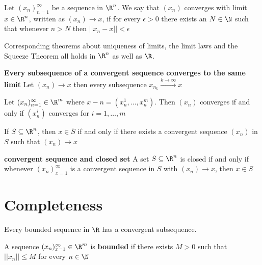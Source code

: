 \documentclass[11pt]{article}
\begin{document}
\begin{defn*}
  Let $(x_n)_{n=1}^{\infty}$ be a sequence in $\R^n$. We say that $(x_n)$ converges with limit $x\in\R^n$, written as $(x_n)\to x$, if for every $\epsilon > 0$ there exists an $N\in\N$ such that whenever $n> N$ then $|| x_n - x|| < \epsilon$
  \begin{rem}
    Corresponding theorems about uniqueness of limits, the limit laws and the Squeeze Theorem all holds in $\R^n$ as well as $\R$.
  \end{rem}
\end{defn*}

\begin{theorem*}
  \textbf{Every subsequence of a convergent sequence converges to the same limit} Let $(x_n) \to x$ then every subsequence $x_{n_k} \xrightarrow{k\to \infty} x$
\end{theorem*}

\begin{proposition*}
   Let $(x_n)_{n=1}^{\infty} \in \R^m$ where $x-n = (x_n^1, \dots, x_n^m)$. Then $(x_n)$ converges if and only if $(x_n^i)$ converges for $i=1,\dots, m$
\end{proposition*}

\begin{proposition*}
   If $S\subseteq \R^n$, then $x\in \overline{S}$ if and only if there exists a convergent sequence $(x_n)$ in $S$ such that $(x_n) \to x$
\end{proposition*}

\begin{corollary*}
  \textbf{convergent sequence and closed set} A set $S\subseteq \R^n$ is closed if and only if whenever $(x_n)_{x=1}^{\infty}$ is a convergent sequence in $S$ with $(x_n)\to x$, then $x\in S$
\end{corollary*}


\section*{Completeness}

\begin{theorem*}
  Every bounded sequence in $\R$ has a convergent subsequence.
\end{theorem*}

\begin{defn*}
  A sequence $(x_n)_{x=1}^{\infty}\in \R^m$ is \textbf{bounded} if there exists $M > 0$ such that $||x_n || \leq M$ for every $n\in \N$
\end{defn*}
\end{document}

